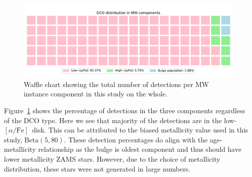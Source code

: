 \documentclass[journal, twocolumn]{IEEEtran}
\newcommand{\lowalpha}{low-$[\alpha/\text{Fe}]$}
\newcommand{\ecc}[1]{e_\text{#1}}
\begin{document}
    \begin{figure}[!h]%
        \centering
        \includegraphics[width=\columnwidth]{analysis_data/main_analysis_folder/dco_type_MW_distribution}
        \caption{Waffle chart showing the total number of detections per MW instance component in this study on the whole.}
        \label{fig:dcotypemwdistribution}
    \end{figure}%

    Figure~\ref{fig:dcotypemwdistribution} shows the percentage of detections in the three components regardless of the DCO type.
    Here we see that majority of the detections are in the \lowalpha\ disk.
    This can be attributed to the biased metallicity value used in this study, $\text{Beta}(5, 80)$.
    These detection percentages do align with the age-metallicity relationship as the bulge is oldest component and thus should have lower metallicity ZAMS stars.
    However, due to the choice of metallicity distribution, these stars were not generated in large numbers.




\end{document}
